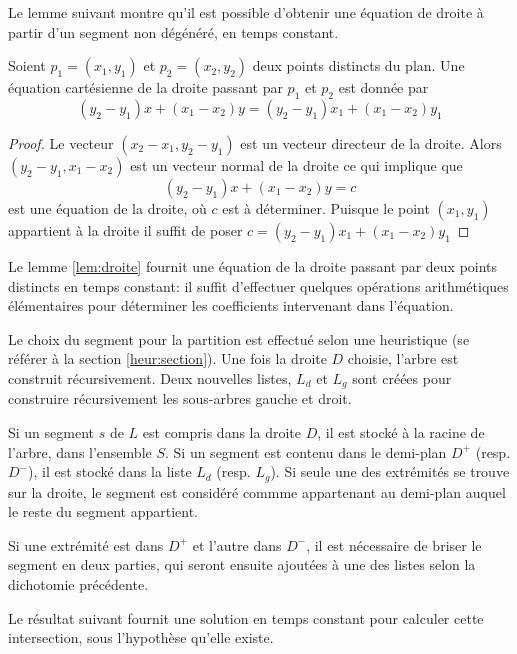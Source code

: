 Le lemme suivant montre qu'il est possible d'obtenir une équation de droite
à partir d'un segment non dégénéré, en temps constant.

\begin{lem}\label{lem:droite}
  Soient $p_1 = (x_1, y_1)$ et $p_2 = (x_2, y_2)$ deux points distincts du
  plan. Une équation cartésienne de la droite  passant par $p_1$ et $p_2$
  est donnée par
  \begin{equation}
    \left(y_2 - y_1\right) x + \left(x_1 - x_2\right) y =
    \left(y_2 - y_1\right) x_1 + \left(x_1 - x_2\right) y_1
  \end{equation}
\end{lem}
\begin{proof}
  Le vecteur $(x_2 - x_1, y_2 - y_1)$ est un vecteur directeur de la droite.
  Alors $(y_2 - y_1, x_1 - x_2)$ est un vecteur normal de la droite ce qui
  implique que
  $$\left(y_2 - y_1\right) x + \left(x_1 - x_2\right) y = c$$ est une équation
  de la droite, où $c$ est à déterminer.
  Puisque le point $(x_1, y_1)$ appartient à la droite il suffit de poser
  $c = \left(y_2 - y_1\right) x_1 + \left(x_1 - x_2\right) y_1$
\end{proof}

Le lemme \ref{lem:droite} fournit une équation de la droite passant
par deux points distincts en temps constant: il suffit d'effectuer
quelques opérations arithmétiques élémentaires pour déterminer les
coefficients intervenant dans l'équation.

Le choix du segment
pour la partition est effectué selon une heuristique (se référer à la section
\ref{heur:section}).
Une fois la droite $D$ choisie, l'arbre est construit récursivement.
Deux nouvelles listes, $L_d$ et $L_g$ sont créées pour construire récursivement
les sous-arbres gauche et droit.

Si un segment $s$ de $L$ est compris dans la droite $D$, il est stocké à
la racine de l'arbre, dans l'ensemble $S$. Si un segment est contenu dans
le demi-plan $D^+$ (resp. $D^-$), il est stocké dans la liste $L_d$ (resp.
$L_g$). Si seule une des extrémités se trouve sur la droite, le segment
est considéré commme appartenant au
 demi-plan auquel le reste du segment appartient.

Si une extrémité est dans $D^+$ et l'autre dans $D^-$, il est nécessaire
de briser le segment en deux parties, qui seront ensuite ajoutées à une des
listes selon la dichotomie précédente.

Le résultat suivant fournit une solution en temps constant pour calculer
cette intersection, sous l'hypothèse qu'elle existe.

